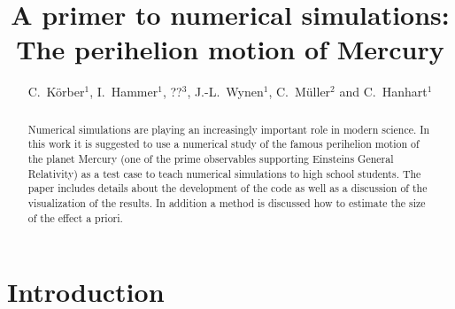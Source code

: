 \documentclass[12pt,ngerman,american]{iopart}
\begin{document}
\title[A primer to numerical simulations]{A primer to numerical simulations: The perihelion motion of Mercury}

\author{
	C.~Körber$^{1}$,
	I.~Hammer$^{1}$,
	??$^{3}$,
	J.-L.~Wynen$^{1}$,
	C.~Müller$^{2}$ and 
	C.~Hanhart$^{1}$
}
\address{
	$^1$ \textit{Institute für Kernphysik and Institute for Advanced Simulations, Forschungszentrum Jülich, D-52425 Jülich, Germany}\\
	$^2$ \textit{??}\\
	$^2$ \textit{??}
}
\vspace{10pt}

\begin{abstract}
Numerical simulations are playing an increasingly important role in modern science.
In this work it is suggested to use a numerical study of the famous perihelion motion of the planet Mercury (one of the prime observables supporting Einsteins General Relativity) as a test case to teach numerical simulations to high school students.
The paper includes details about the development of the code as well as a discussion of the visualization of the results.
In addition a method is discussed how to estimate the size of the effect a priori. 
\end{abstract}

%
%
%
% 
%

\listoftodos

\section{Introduction}\label{sec:intro}
\end{document}
